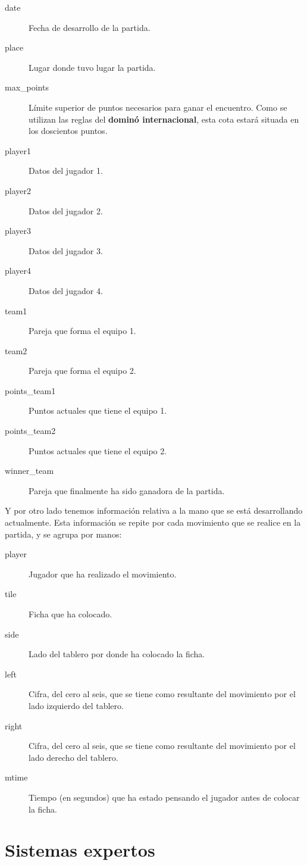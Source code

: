\begin{description}
    \item[date] Fecha de desarrollo de la partida.
    \item[place] Lugar donde tuvo lugar la partida.
    \item[max\_points] Límite superior de puntos necesarios para ganar el encuentro. Como se utilizan las reglas del
        \textbf{dominó internacional}, esta cota estará situada en los doscientos puntos.
    \item[player1] Datos del jugador 1.
    \item[player2] Datos del jugador 2.
    \item[player3] Datos del jugador 3.
    \item[player4] Datos del jugador 4.
    \item[team1] Pareja que forma el equipo 1.
    \item[team2] Pareja que forma el equipo 2.
    \item[points\_team1] Puntos actuales que tiene el equipo 1.
    \item[points\_team2] Puntos actuales que tiene el equipo 2.
    \item[winner\_team] Pareja que finalmente ha sido ganadora de la partida.
\end{description}

Y por otro lado tenemos información relativa a la mano que se está desarrollando actualmente. Esta información se repite
por cada movimiento que se realice en la partida, y se agrupa por manos:

\begin{description}
    \item[player] Jugador que ha realizado el movimiento.
    \item[tile] Ficha que ha colocado.
    \item[side] Lado del tablero por donde ha colocado la ficha.
    \item[left] Cifra, del cero al seis, que se tiene como resultante del movimiento por el lado izquierdo del tablero.
    \item[right] Cifra, del cero al seis, que se tiene como resultante del movimiento por el lado derecho del tablero.
    \item[mtime] Tiempo (en segundos) que ha estado pensando el jugador antes de colocar la ficha.
\end{description}


\section{Sistemas expertos}


